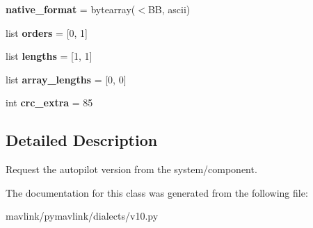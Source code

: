 \begin{DoxyCompactItemize}
{\bfseries native\+\_\+format} = bytearray(\textquotesingle{}$<$BB\textquotesingle{}, \textquotesingle{}ascii\textquotesingle{})
\item 
\mbox{\label{classpymavlink_1_1dialects_1_1v10_1_1MAVLink__autopilot__version__request__message_a010127380c6059823e24bb760848644d}} 
list {\bfseries orders} = \mbox{[}0, 1\mbox{]}
\item 
\mbox{\label{classpymavlink_1_1dialects_1_1v10_1_1MAVLink__autopilot__version__request__message_a1e4201b0d99dd8dc20f064d4b114a8d4}} 
list {\bfseries lengths} = \mbox{[}1, 1\mbox{]}
\item 
\mbox{\label{classpymavlink_1_1dialects_1_1v10_1_1MAVLink__autopilot__version__request__message_a00b1f6ff5badf509af7ce36de0ae25f9}} 
list {\bfseries array\+\_\+lengths} = \mbox{[}0, 0\mbox{]}
\item 
\mbox{\label{classpymavlink_1_1dialects_1_1v10_1_1MAVLink__autopilot__version__request__message_ae578807f728bc7a3a47117095dc48803}} 
int {\bfseries crc\+\_\+extra} = 85
\end{DoxyCompactItemize}


\subsection{Detailed Description}
\begin{DoxyVerb}Request the autopilot version from the system/component.
\end{DoxyVerb}
 

The documentation for this class was generated from the following file\+:\begin{DoxyCompactItemize}
\item 
mavlink/pymavlink/dialects/v10.\+py\end{DoxyCompactItemize}
